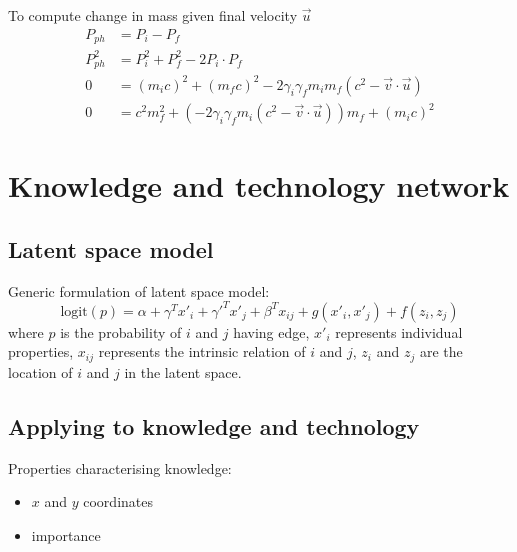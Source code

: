 \documentclass[12pt, letterpaper]{article}
\begin{document}
    To compute change in mass given final velocity $\overrightarrow{u}$
    \begin{align*}
        P_{ph} &= P_i - P_f \\
        P_{ph}^2 &= P_i^2 + P_f^2 - 2 P_i \cdot P_f \\
        0 &= (m_i c)^2 + (m_f c)^2 - 2 \gamma_i \gamma_f m_i m_f ( c^2 - \overrightarrow{v} \cdot \overrightarrow{u}) \\
        0 &= c^2 m_f^2 + (- 2 \gamma_i \gamma_f m_i ( c^2 - \overrightarrow{v} \cdot \overrightarrow{u})) m_f + (m_i c)^2
    \end{align*}


    \section{Knowledge and technology network}\label{sec:knowledge-and-technology-network}

    \subsection{Latent space model}\label{subsec:latent-space-model}
    Generic formulation of latent space model:
    \begin{equation}
        \label{eq:equation}
        \textrm{logit}(p) = \alpha + \gamma^T x'_i + \gamma'^T x'_j + \beta^T x_{ij} + g(x'_i, x'_j) + f(z_i, z_j)
    \end{equation}
    where $p$ is the probability of $i$ and $j$ having edge, $x'_i$ represents individual properties,
    $x_{ij}$ represents the intrinsic
    relation of $i$ and $j$, $z_i$ and $z_j$ are the location of $i$ and $j$ in the latent space.

    \subsection{Applying to knowledge and technology}\label{subsec:applying-to-knowledge-and-technology}
    Properties characterising knowledge:
    \begin{itemize}
        \item $x$ and $y$ coordinates
        \item importance
    \end{itemize}
\end{document}

